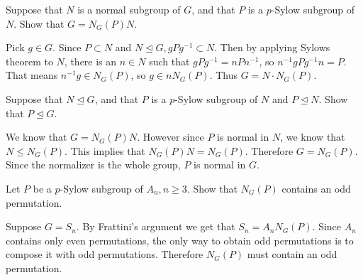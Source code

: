 \documentclass[12pt, answers]{exam}
\begin{document}
\begin{questions}
        \question Suppose that $N$ is a normal subgroup of $G$, and that $P$ is a $p$-Sylow subgroup of $N$.
        Show that $G = N_G(P)N.$
        \begin{solution}
            Pick $g \in G$. Since $P \subset N$ and $N \trianglelefteq G, gPg^{-1} \subset N$. Then by applying Sylows
            theorem to $N$, there is an $n \in N$ such that $gPg^{-1} = nPn^{-1}$, so $n^{-1}gPg^{-1}n = P$. That means
            $n^{-1}g \in N_G(P)$, so $g \in nN_G(P)$. Thus $G = N \cdot N_G(P)$.
        \end{solution}

        \question Suppose that $N \trianglelefteq G$, and that $P$ is a $p$-Sylow subgroup of $N$ and $P \trianglelefteq N$.
        Show that $P \trianglelefteq G$.
        \begin{solution}
            We know that $G = N_G(P)N$. However since $P$ is normal in $N$, we know that $N \leq N_G(P)$. This implies that
            $N_G(P)N = N_G(P)$. Therefore $G = N_G(P)$. Since the normalizer is the whole group, $P$ is normal in $G$.
        \end{solution}
        \pagebreak
        \question Let $P$ be a $p$-Sylow subgroup of $A_n, n\geq 3$. Show that $N_G(P)$ contains an odd permutation.
        \begin{solution}
            Suppose $G = S_n$.
            By Frattini's argument we get that $S_n = A_nN_G(P)$. Since $A_n$ contains only even permutations, the only
            way to obtain odd permutations is to compose it with odd permutations. Therefore $N_G(P)$ must contain an odd
            permutation.
        \end{solution}
    \end{questions}
\end{document}
